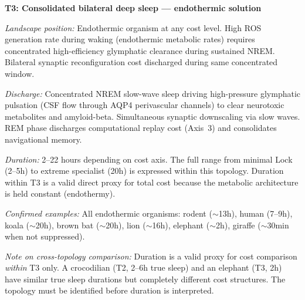 \documentclass[10pt, a4paper]{article}
\begin{document}
\vspace{0.4em}

\begin{mdframed}[
  backgroundcolor=topologybox,
  linecolor=headergreen,
  linewidth=0.8pt,
  innertopmargin=0.6em,
  innerbottommargin=0.6em,
  innerleftmargin=0.8em,
  innerrightmargin=0.8em
]
\textbf{T3: Consolidated bilateral deep
sleep --- endothermic solution}

\textit{Landscape position:} Endothermic
organism at any cost level. High ROS
generation rate during waking (endothermic
metabolic rates) requires concentrated
high-efficiency glymphatic clearance
during sustained NREM. Bilateral synaptic
reconfiguration cost discharged during
same concentrated window.

\textit{Discharge:} Concentrated NREM
slow-wave sleep driving high-pressure
glymphatic pulsation (CSF flow through
AQP4 perivascular channels) to clear
neurotoxic metabolites and amyloid-beta.
Simultaneous synaptic downscaling via
slow waves. REM phase discharges
computational replay cost (Axis~3) and
consolidates navigational memory.

\textit{Duration:} 2--22 hours depending
on cost axis. The full range from minimal
Lock (2--5h) to extreme specialist (20h)
is expressed within this topology. Duration
within T3 is a valid direct proxy for
total cost because the metabolic
architecture is held constant (endothermy).

\textit{Confirmed examples:} All
endothermic organisms: rodent ($\sim$13h),
human (7--9h), koala ($\sim$20h), brown
bat ($\sim$20h), lion ($\sim$16h),
elephant ($\sim$2h), giraffe ($\sim$30min
when not suppressed).

\textit{Note on cross-topology comparison:}
Duration is a valid proxy for cost
comparison \textit{within} T3 only. A
crocodilian (T2, 2--6h true sleep) and an
elephant (T3, 2h) have similar true sleep
durations but completely different cost
structures. The topology must be identified
before duration is interpreted.
\end{mdframed}

\vspace{0.4em}
\end{document}
